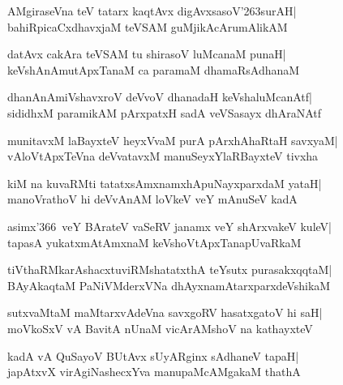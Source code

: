 \documentclass[twoside,12pt,openright]{book}
\def\S{\char'263}
\newcounter{shloka}[chapter]
\begin{document}
\begin{shloka}%
AMgiraseVna teV tatarx kaqtAvx digAvxsasoV\S surAH|\\
bahiRpicaCxdhavxjaM teVSAM guMjikAcArumAlikAM
\end{shloka}

\begin{shloka}%
datAvx cakAra teVSAM tu shirasoV luMcanaM punaH|\\
keVshAnAmutApxTanaM ca paramaM dhamaRsAdhanaM
\end{shloka}

\begin{shloka}%
dhanAnAmiVshavxroV deVvoV dhanadaH keVshaluMcanAtf|\\
sididhxM paramikAM pArxpatxH sadA veVSasayx dhAraNAtf
\end{shloka}

\begin{shloka}%
munitavxM laBayxteV heyxVvaM purA pArxhAhaRtaH savxyaM|\\
vAloVtApxTeVna deVvatavxM manuSeyxYlaRBayxteV tivxha
\end{shloka}

\begin{shloka}%
kiM na kuvaRMti tatatxsAmxnamxhApuNayxparxdaM yataH|\\
manoVrathoV hi deVvAnAM loVkeV veY mAnuSeV kadA
\end{shloka}

\begin{shloka}%
asimx\char'366\ veY BArateV vaSeRV janamx veY shArxvakeV kuleV|\\
tapasA yukatxmAtAmxnaM keVshoVtApxTanapUvaRkaM
\end{shloka}

\begin{shloka}%
tiVthaRMkarAshacxtuviRMshatatxthA teYsutx purasakxqqtaM|\\
BAyAkaqtaM PaNiVMderxVNa dhAyxnamAtarxparxdeVshikaM
\end{shloka}

\begin{shloka}%
sutxvaMtaM maMtarxvAdeVna savxgoRV hasatxgatoV hi saH|\\
moVkoSxV vA BavitA nUnaM vicArAMshoV na kathayxteV
\end{shloka}

\begin{shloka}%
kadA vA QuSayoV BUtAvx sUyARginx sAdhaneV tapaH|\\
japAtxvX virAgiNashecxYva manupaMcAMgakaM thathA
\end{shloka}
\end{document}

